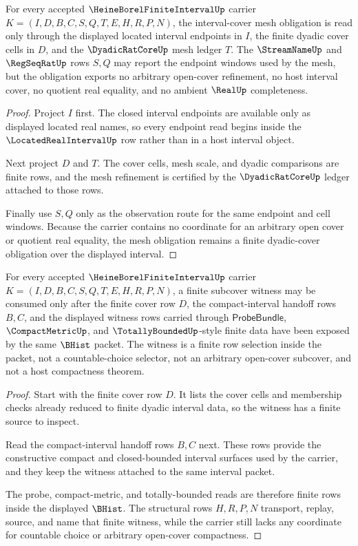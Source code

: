 \begin{theorem}
\label{thm:heine-borel-finite-interval-interval-cover-mesh}
For every accepted $\HeineBorelFiniteIntervalUp$ carrier $K=(I,D,B,C,S,Q,T,E,H,R,P,N)$, the interval-cover mesh obligation is read only through the displayed located interval endpoints in $I$, the finite dyadic cover cells in $D$, and the $\DyadicRatCoreUp$ mesh ledger $T$. The $\StreamNameUp$ and $\RegSeqRatUp$ rows $S,Q$ may report the endpoint windows used by the mesh, but the obligation exports no arbitrary open-cover refinement, no host interval cover, no quotient real equality, and no ambient $\RealUp$ completeness.
\end{theorem}
\begin{proof}
Project $I$ first. The closed interval endpoints are available only as displayed located real names, so every endpoint read begins inside the $\LocatedRealIntervalUp$ row rather than in a host interval object.

Next project $D$ and $T$. The cover cells, mesh scale, and dyadic comparisons are finite rows, and the mesh refinement is certified by the $\DyadicRatCoreUp$ ledger attached to those rows.

Finally use $S,Q$ only as the observation route for the same endpoint and cell windows. Because the carrier contains no coordinate for an arbitrary open cover or quotient real equality, the mesh obligation remains a finite dyadic-cover obligation over the displayed interval.
\end{proof}

\begin{theorem}
\label{thm:heine-borel-finite-interval-subcover-witness}
For every accepted $\HeineBorelFiniteIntervalUp$ carrier $K=(I,D,B,C,S,Q,T,E,H,R,P,N)$, a finite subcover witness may be consumed only after the finite cover row $D$, the compact-interval handoff rows $B,C$, and the displayed witness rows carried through $\mathsf{ProbeBundle}$, $\CompactMetricUp$, and $\TotallyBoundedUp$-style finite data have been exposed by the same $\BHist$ packet. The witness is a finite row selection inside the packet, not a countable-choice selector, not an arbitrary open-cover subcover, and not a host compactness theorem.
\end{theorem}
\begin{proof}
Start with the finite cover row $D$. It lists the cover cells and membership checks already reduced to finite dyadic interval data, so the witness has a finite source to inspect.

Read the compact-interval handoff rows $B,C$ next. These rows provide the constructive compact and closed-bounded interval surfaces used by the carrier, and they keep the witness attached to the same interval packet.

The probe, compact-metric, and totally-bounded reads are therefore finite rows inside the displayed $\BHist$. The structural rows $H,R,P,N$ transport, replay, source, and name that finite witness, while the carrier still lacks any coordinate for countable choice or arbitrary open-cover compactness.
\end{proof}

